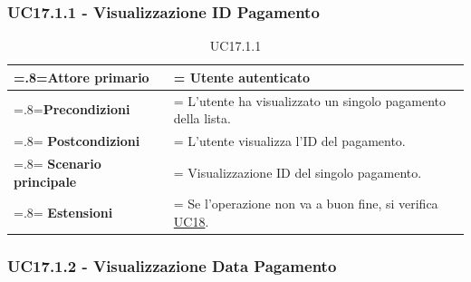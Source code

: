         \subsubsection{UC17.1.1 - Visualizzazione ID Pagamento}
        \label{UC17.1.1}

            \begin{table}[H]
                \centering
                \renewcommand{\arraystretch}{1.8}
                \renewcommand\tabularxcolumn[1]{m{#1}}
                \begin{tabularx}{0.9\textwidth} {
                    >{\hsize=.8\hsize\linewidth=\hsize}X
                    >{\hsize=1.2\hsize\linewidth=\hsize}X}
                    \hline
                    \textbf{Attore primario} & Utente autenticato \\
                    \hline
                    \textbf{Precondizioni} & L'utente ha visualizzato un singolo pagamento della lista. \\
                    \hline
                    \textbf{Postcondizioni} & L'utente visualizza l'ID del pagamento. \\
                    \hline
                    \textbf{Scenario principale} & Visualizzazione ID del singolo pagamento. \\
                    \hline
                    \textbf{Estensioni} & Se l'operazione non va a buon fine, si verifica \hyperref[UC18]{UC18}. \\
                    \hline
                \end{tabularx}
                \caption{UC17.1.1}
            \end{table}

        \subsubsection{UC17.1.2 - Visualizzazione Data Pagamento}
        \label{UC17.1.2}

